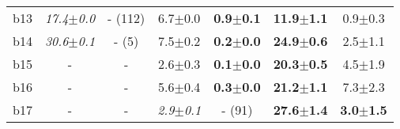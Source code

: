 \begin{longtable}{|l|c|c|c|c|c|c|}
\\
b13&\textit{17.4$\pm$0.0} & - (112)&6.7$\pm$0.0 & \textbf{0.9$\pm$0.1}&\textbf{11.9$\pm$1.1} & 0.9$\pm$0.3
\\
b14&\textit{30.6$\pm$0.1} & - (5)&7.5$\pm$0.2 & \textbf{0.2$\pm$0.0}&\textbf{24.9$\pm$0.6} & 2.5$\pm$1.1
\\
b15&- & -&2.6$\pm$0.3 & \textbf{0.1$\pm$0.0}&\textbf{20.3$\pm$0.5} & 4.5$\pm$1.9
\\
b16&- & -&5.6$\pm$0.4 & \textbf{0.3$\pm$0.0}&\textbf{21.2$\pm$1.1} & 7.3$\pm$2.3
\\
b17&- & -&\textit{2.9$\pm$0.1} & - (91)&\textbf{27.6$\pm$1.4} & \textbf{3.0$\pm$1.5}
\\
\hline
\end{longtable}
